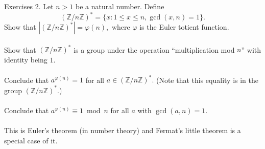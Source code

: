 \documentclass[handout, dvipsnames]{beamer}
\theoremstyle{definition}
\begin{document}
\begin{frame}{Exercises}
    2. Let $n > 1$ be a natural number. Define
    \begin{equation*} 
        (\mathbb{Z}/n\mathbb{Z})^* = \{x : 1 \le x \le n, \gcd(x, n) = 1\}.
    \end{equation*}
    Show that $|(\mathbb{Z}/n\mathbb{Z})^*| = \varphi(n),$ where $\varphi$ is the Euler totient function.\\~\\
    Show that $(\mathbb{Z}/n\mathbb{Z})^*$ is a group under the operation ``multiplication mod $n$'' with identity being $1.$\\~\\
    Conclude that $a^{\varphi(n)} = 1$ for all $a \in (\mathbb{Z}/n\mathbb{Z})^*.$ (Note that this equality is in the group $(\mathbb{Z}/n\mathbb{Z})^*.$)\\~\\
    Conclude that $a^{\varphi(n)} \equiv 1 \bmod n$ for all $a$ with $\gcd(a, n) = 1.$\\~\\
    This is Euler's theorem (in number theory) and Fermat's little theorem is a special case of it.
\end{frame}
\end{document}
